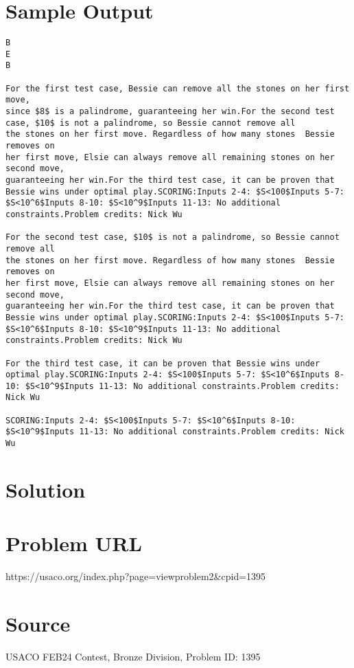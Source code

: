 \documentclass[12pt]{article}
\begin{document}
\section*{Sample Output}
\begin{verbatim}
B
E
B

For the first test case, Bessie can remove all the stones on her first move,
since $8$ is a palindrome, guaranteeing her win.For the second test case, $10$ is not a palindrome, so Bessie cannot remove all
the stones on her first move. Regardless of how many stones  Bessie removes on
her first move, Elsie can always remove all remaining stones on her second move,
guaranteeing her win.For the third test case, it can be proven that Bessie wins under optimal play.SCORING:Inputs 2-4: $S<100$Inputs 5-7: $S<10^6$Inputs 8-10: $S<10^9$Inputs 11-13: No additional constraints.Problem credits: Nick Wu

For the second test case, $10$ is not a palindrome, so Bessie cannot remove all
the stones on her first move. Regardless of how many stones  Bessie removes on
her first move, Elsie can always remove all remaining stones on her second move,
guaranteeing her win.For the third test case, it can be proven that Bessie wins under optimal play.SCORING:Inputs 2-4: $S<100$Inputs 5-7: $S<10^6$Inputs 8-10: $S<10^9$Inputs 11-13: No additional constraints.Problem credits: Nick Wu

For the third test case, it can be proven that Bessie wins under optimal play.SCORING:Inputs 2-4: $S<100$Inputs 5-7: $S<10^6$Inputs 8-10: $S<10^9$Inputs 11-13: No additional constraints.Problem credits: Nick Wu

SCORING:Inputs 2-4: $S<100$Inputs 5-7: $S<10^6$Inputs 8-10: $S<10^9$Inputs 11-13: No additional constraints.Problem credits: Nick Wu
\end{verbatim}

\section*{Solution}


\section*{Problem URL}
https://usaco.org/index.php?page=viewproblem2&cpid=1395

\section*{Source}
USACO FEB24 Contest, Bronze Division, Problem ID: 1395
\end{document}
